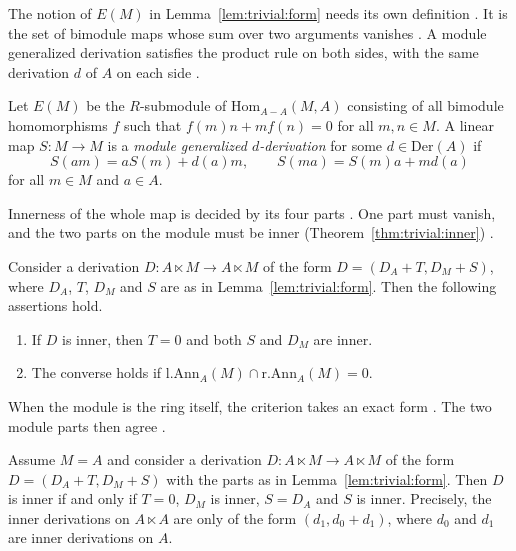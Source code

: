 The notion of $E(M)$ in Lemma~\ref{lem:trivial:form} needs its own definition
\cite[p.~7]{BennisFahid2017}. It is the set of bimodule maps whose sum over
two arguments vanishes \cite[p.~7]{BennisFahid2017}. A module generalized
derivation satisfies the product rule on both sides, with the same derivation
$d$ of $A$ on each side \cite[p.~7]{BennisFahid2017}.

\begin{definition}\label{def:trivial:egeneral}
Let $E(M)$ be the $R$-submodule of $\mathrm{Hom}_{A-A}(M,A)$ consisting of all
bimodule homomorphisms $f$ such that $f(m)n+mf(n)=0$ for all $m,n\in M$. A linear
map $S\colon M\to M$ is a \emph{module generalized $d$-derivation} for some
$d\in\mathrm{Der}(A)$ if
\begin{equation*}
S(am)=aS(m)+d(a)m,\qquad S(ma)=S(m)a+md(a)
\end{equation*}
for all $m\in M$ and $a\in A$.
\end{definition}

Innerness of the whole map is decided by its four parts
\cite[p.~14]{BennisFahid2017}. One part must vanish, and the two parts on the
module must be inner (Theorem~\ref{thm:trivial:inner})
\cite[p.~14]{BennisFahid2017}.

\begin{theorem}\label{thm:trivial:inner}
Consider a derivation $D\colon A\ltimes M\to A\ltimes M$ of the form
$D=(D_{A}+T,D_{M}+S)$, where $D_{A}$, $T$, $D_{M}$ and $S$ are as in
Lemma~\ref{lem:trivial:form}. Then the following assertions hold.
\begin{enumerate}[label=(\arabic*)]
\item If $D$ is inner, then $T=0$ and both $S$ and $D_{M}$ are inner.
\item The converse holds if $\mathrm{l.Ann}_{A}(M)\cap\mathrm{r.Ann}_{A}(M)=0$.
\end{enumerate}
\end{theorem}

When the module is the ring itself, the criterion takes an exact form
\cite[p.~14]{BennisFahid2017}. The two module parts then agree
\cite[p.~14]{BennisFahid2017}.

\begin{corollary}\label{cor:trivial:self}
Assume $M=A$ and consider a derivation $D\colon A\ltimes M\to A\ltimes M$ of the
form $D=(D_{A}+T,D_{M}+S)$ with the parts as in Lemma~\ref{lem:trivial:form}. Then
$D$ is inner if and only if $T=0$, $D_{M}$ is inner, $S=D_{A}$ and $S$ is inner.
Precisely, the inner derivations on $A\ltimes A$ are only of the form
$(d_{1},d_{0}+d_{1})$, where $d_{0}$ and $d_{1}$ are inner derivations on $A$.
\end{corollary}

